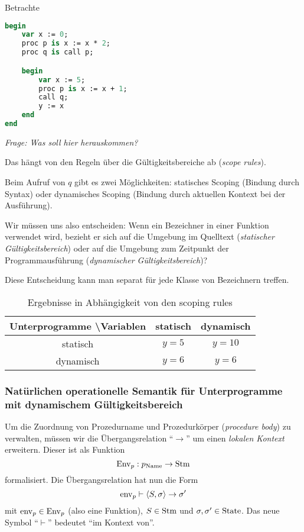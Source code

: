 \par\medskip
\begin{example}
Betrachte
\begin{lstlisting}[language=Pascal, caption=Programm mit Unterprogrammen]
begin
    var x := 0;
    proc p is x := x * 2;
    proc q is call p;

    begin
        var x := 5;
        proc p is x := x + 1;
        call q;
        y := x
    end
end
\end{lstlisting}

\emph{Frage: Was soll hier herauskommen?}

Das hängt von den Regeln über die Gültigkeitsbereiche ab (\emph{scope rules}).

Beim Aufruf von $q$ gibt es zwei Möglichkeiten: statisches Scoping (Bindung durch Syntax) oder dynamisches Scoping (Bindung durch aktuellen Kontext bei der Ausführung).

Wir müssen uns also entscheiden: Wenn ein Bezeichner in einer Funktion verwendet wird, bezieht er sich auf die Umgebung im Quelltext (\emph{statischer Gültigkeitsbereich}) oder auf die Umgebung zum Zeitpunkt der Programmausführung (\emph{dynamischer Gültigkeitsbereich})?

Diese Entscheidung kann man separat für jede Klasse von Bezeichnern treffen.
\end{example}

\begin{table}[H]
    \centering
    \begin{tabular}{c||c|c}
        Unterprogramme \textbackslash Variablen & statisch & dynamisch \\ \hline \hline
        statisch  & $y = 5$ & $y = 10$ \\ \hline
        dynamisch & $y = 6$ & $y = 6$
    \end{tabular}
    \caption{Ergebnisse in Abhängigkeit von den scoping rules}
\end{table}



\subsubsection{Natürlichen operationelle Semantik für Unterprogramme mit dynamischem Gültigkeitsbereich}

Um die Zuordnung von Prozedurname und Prozedurkörper (\emph{procedure body}) zu verwalten, müssen wir die Übergangsrelation ``$\to$'' um einen \emph{lokalen Kontext} erweitern. Dieser ist als Funktion \[
\operatorname{Env}_p: p_{\text{Name}} \to \operatorname{Stm}
\] formalisiert. Die Übergangsrelation hat nun die Form \[
    \operatorname{env}_p \vdash \langle S, \sigma \rangle \to \sigma'
\] mit $\operatorname{env}_p \in \operatorname{Env}_p$ (also eine Funktion), $S \in \operatorname{Stm}$ und $\sigma, \sigma' \in \operatorname{State}$. Das neue Symbol ``$\vdash$'' bedeutet ``im Kontext von''.

